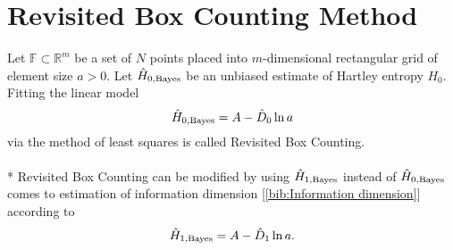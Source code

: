 \section {Revisited Box Counting Method}
Let $\mathbb{F} \subset \mathbb{R}^{m}$ be a set of $N$ points placed into $m$-dimensional rectangular grid of element size $a > 0$. Let $\hat{H}_{0,\mbox{\scriptsize{Bayes}}}$ be an unbiased estimate of Hartley entropy $H_{0}$. Fitting the linear model
\begin{equation} 
\label{eq:hlinmod}
\hat{H}_{0,\mbox{\scriptsize{Bayes}}} = A - \hat{D}_{0}\ln{a}
\end{equation}
via the method of least squares is called Revisited Box Counting.\\
\\*
Revisited Box Counting can be modified by %
using $\hat{H}_{1,\mbox{\scriptsize{Bayes}}}$ instead of $\hat{H}_{0,\mbox{\scriptsize{Bayes}}}$ comes to estimation of information dimension [\ref{bib:Information dimension}] according to
\begin{equation} 
\label{eq:inform}
\hat{H}_{1,\mbox{\scriptsize{Bayes}}} = A - \hat{D}_{1}\ln{a}.
\end{equation}
